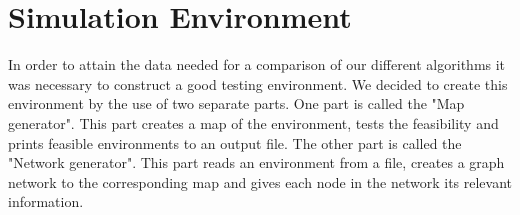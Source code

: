 \chapter{Simulation Environment}
In order to attain the data needed for a comparison of our different algorithms it was necessary to construct a good testing environment. We decided to create this environment by the use of two separate parts. One part is called the "Map generator". This part creates a map of the environment, tests the feasibility and prints feasible environments to an output file. The other part is called the "Network generator". This part reads an environment from a file, creates a graph network to the corresponding map and gives each node in the network its relevant information.\\

